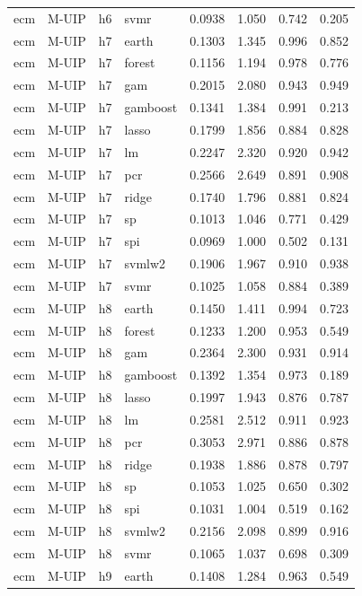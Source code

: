 \begin{ThreePartTable}
\begin{longtable}[t]{llclcccc}
ecm & M-UIP & h6 & svmr & 0.0938 & 1.050 & 0.742 & 0.205\\
\addlinespace
ecm & M-UIP & h7 & earth & 0.1303 & 1.345 & 0.996 & 0.852\\
ecm & M-UIP & h7 & forest & 0.1156 & 1.194 & 0.978 & 0.776\\
ecm & M-UIP & h7 & gam & 0.2015 & 2.080 & 0.943 & 0.949\\
ecm & M-UIP & h7 & gamboost & 0.1341 & 1.384 & 0.991 & 0.213\\
ecm & M-UIP & h7 & lasso & 0.1799 & 1.856 & 0.884 & 0.828\\
ecm & M-UIP & h7 & lm & 0.2247 & 2.320 & 0.920 & 0.942\\
ecm & M-UIP & h7 & pcr & 0.2566 & 2.649 & 0.891 & 0.908\\
ecm & M-UIP & h7 & ridge & 0.1740 & 1.796 & 0.881 & 0.824\\
ecm & M-UIP & h7 & sp & 0.1013 & 1.046 & 0.771 & 0.429\\
ecm & M-UIP & h7 & spi & 0.0969 & 1.000 & 0.502 & 0.131\\
ecm & M-UIP & h7 & svmlw2 & 0.1906 & 1.967 & 0.910 & 0.938\\
ecm & M-UIP & h7 & svmr & 0.1025 & 1.058 & 0.884 & 0.389\\
\addlinespace
ecm & M-UIP & h8 & earth & 0.1450 & 1.411 & 0.994 & 0.723\\
ecm & M-UIP & h8 & forest & 0.1233 & 1.200 & 0.953 & 0.549\\
ecm & M-UIP & h8 & gam & 0.2364 & 2.300 & 0.931 & 0.914\\
ecm & M-UIP & h8 & gamboost & 0.1392 & 1.354 & 0.973 & 0.189\\
ecm & M-UIP & h8 & lasso & 0.1997 & 1.943 & 0.876 & 0.787\\
ecm & M-UIP & h8 & lm & 0.2581 & 2.512 & 0.911 & 0.923\\
ecm & M-UIP & h8 & pcr & 0.3053 & 2.971 & 0.886 & 0.878\\
ecm & M-UIP & h8 & ridge & 0.1938 & 1.886 & 0.878 & 0.797\\
ecm & M-UIP & h8 & sp & 0.1053 & 1.025 & 0.650 & 0.302\\
ecm & M-UIP & h8 & spi & 0.1031 & 1.004 & 0.519 & 0.162\\
ecm & M-UIP & h8 & svmlw2 & 0.2156 & 2.098 & 0.899 & 0.916\\
ecm & M-UIP & h8 & svmr & 0.1065 & 1.037 & 0.698 & 0.309\\
\addlinespace
ecm & M-UIP & h9 & earth & 0.1408 & 1.284 & 0.963 & 0.549\\

\end{longtable}
\end{ThreePartTable}

